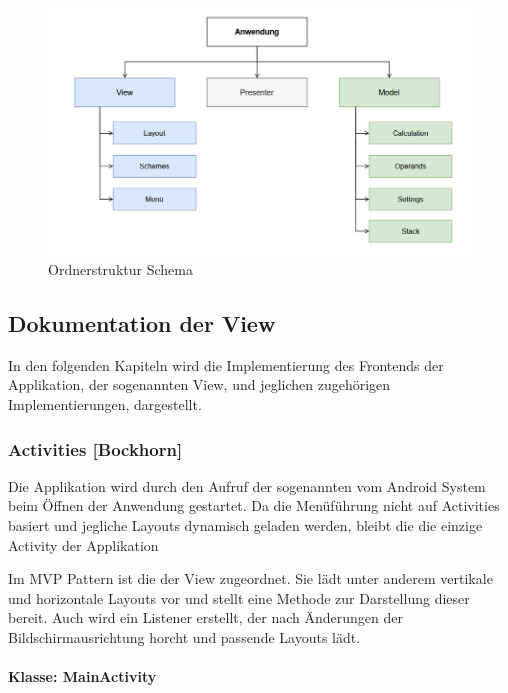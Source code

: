 \begin{figure}[!h]
	\includegraphics[scale=1]{img/ordnerstruktur2}
	\caption[Ordnerstruktur Schema]{Ordnerstruktur Schema\footnotemark}
\end{figure}

\subsection{Dokumentation der View}

In den folgenden Kapiteln wird die Implementierung des Frontends der Applikation, der sogenannten View, und jeglichen zugehörigen Implementierungen, dargestellt.

\subsubsection{Activities [Bockhorn]}

Die Applikation wird durch den Aufruf der sogenannten  vom Android System beim Öffnen der Anwendung gestartet. Da die Menüführung nicht auf Activities basiert und jegliche Layouts dynamisch geladen werden, bleibt die  die einzige Activity der Applikation

Im MVP Pattern ist die  der View zugeordnet. Sie lädt unter anderem vertikale und horizontale Layouts vor und stellt eine Methode zur Darstellung dieser bereit. Auch wird ein Listener erstellt, der nach Änderungen der Bildschirmausrichtung horcht und passende Layouts lädt.

\paragraph{Klasse: MainActivity}

